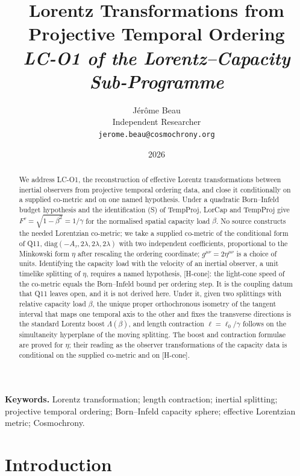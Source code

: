 \documentclass[12pt,a4paper]{article}
\title{Lorentz Transformations from Projective Temporal Ordering\\[4pt]
\normalsize\itshape LC-O1 of the Lorentz--Capacity Sub-Programme}
\author{J\'er\^ome Beau\\[2pt]
\small Independent Researcher\\
\small \texttt{jerome.beau@cosmochrony.org}}
\date{2026}
\theoremstyle{remark}
\theoremstyle{definition}
\begin{document}
  \maketitle

  \begin{abstract}
    We address LC-O1, the reconstruction of effective Lorentz transformations between
    inertial observers from projective temporal ordering data, and close it conditionally on a supplied co-metric
    and on one named hypothesis.
    Under a quadratic Born--Infeld budget hypothesis and the identification (S) of TempProj, LorCap and TempProj
    give $F^\tau = \sqrt{1-\beta^2} = 1/\gamma$
    for the normalised spatial capacity load $\beta$.
    No source constructs the needed Lorentzian co-metric; we take a supplied co-metric of the conditional form of
    Q11, $\mathrm{diag}(-A_\tau, 2\lambda, 2\lambda, 2\lambda)$ with two independent coefficients, proportional to
    the Minkowski form $\eta$ after rescaling the ordering coordinate; $g^{\mu\nu}=2\eta^{\mu\nu}$ is a choice of
    units.
    Identifying the capacity load with the velocity of an inertial observer, a unit timelike splitting of $\eta$,
    requires a named hypothesis, [H-cone]: the
    light-cone speed of the co-metric equals the Born--Infeld bound per ordering step.
    It is the coupling datum that Q11 leaves open, and it is not derived here.
    Under it, given two splittings with relative capacity load $\beta$, the unique proper
    orthochronous isometry of the tangent interval that maps one temporal axis
    to the other and fixes the transverse directions is the standard Lorentz boost $\Lambda(\beta)$, and length
    contraction $\ell = \ell_0/\gamma$ follows on the simultaneity
    hyperplane of the moving splitting.
    The boost and contraction formulae are proved for $\eta$; their reading as the observer transformations of the
    capacity data is conditional on the supplied co-metric and on [H-cone].
  \end{abstract}
  \enlargethispage{1\baselineskip}

  \medskip
  \noindent\textbf{Keywords.}
  Lorentz transformation; length contraction; inertial splitting; projective temporal
  ordering; Born--Infeld capacity sphere; effective Lorentzian metric; Cosmochrony.

  \newpage
  \tableofcontents

  \newpage
  \section{Introduction}
    \label{sec:introduction}
\end{document}
